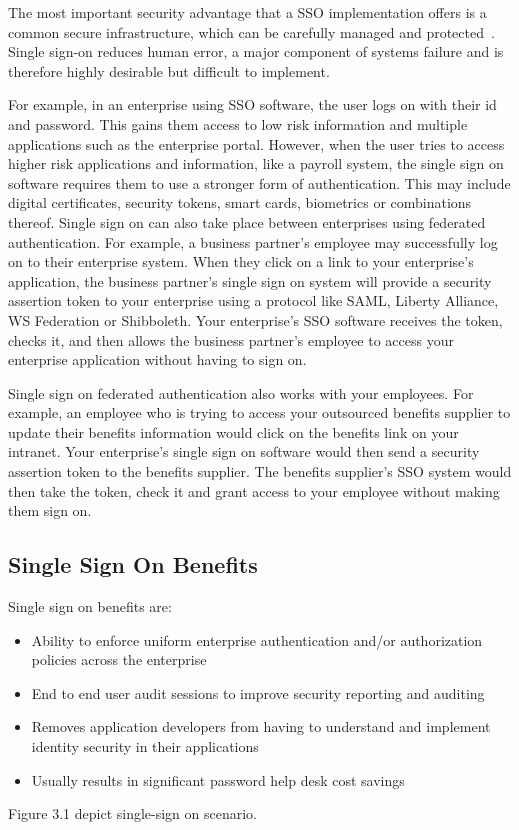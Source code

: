 The most important security advantage that a SSO implementation offers is a common secure infrastructure, which can be carefully managed and protected~\cite{andro}.
Single sign-on reduces human error, a major component of systems failure and is therefore highly desirable but difficult to implement.
\par For example, in an enterprise using SSO software, the user logs on with their id and password. This gains them access to low risk information and multiple applications such as the enterprise portal. However, when the user tries to access higher risk applications and information, like a payroll system, the single sign on software requires them to use a stronger form of authentication. This may include digital certificates, security tokens, smart cards, biometrics or combinations thereof. 
Single sign on can also take place between enterprises using federated authentication. For example, a business partner's employee may successfully log on to their enterprise system. When they click on a link to your enterprise's application, the business partner's single sign on system will provide a security assertion token to your enterprise using a protocol like SAML, Liberty Alliance, WS Federation or Shibboleth. Your enterprise's SSO software receives the token, checks it, and then allows the business partner's employee to access your enterprise application without having to sign on.

Single sign on federated authentication also works with your employees. For example, an employee who is trying to access your outsourced benefits supplier to update their benefits information would click on the benefits link on your intranet. Your enterprise's single sign on software would then send a security assertion token to the benefits supplier. The benefits supplier's SSO system would then take the token, check it and grant access to your employee without making them sign on.

\subsection{Single Sign On Benefits}
\hspace{5mm} Single sign on benefits are:
 \begin{itemize}
     \item Ability to enforce uniform enterprise authentication and/or authorization policies across the enterprise
    \item End to end user audit sessions to improve security reporting and auditing
    \item Removes application developers from having to understand and implement identity security in their applications
    \item Usually results in significant password help desk cost savings
\end{itemize}
Figure 3.1 depict single-sign on scenario.

